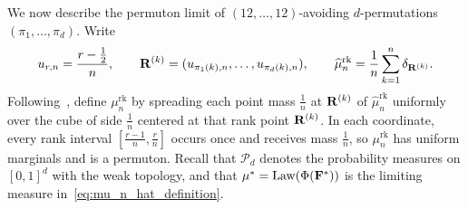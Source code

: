 \documentclass[11pt,letterpaper]{article}
\begin{document}
We now describe the permuton limit of $(12,\ldots,12)$-avoiding $d$-permutations $(\pi_1,\ldots,\pi_d)$.
Write
\[
      u_{r,n}=\frac{r-\tfrac12}{n},\qquad \mathbf R^{(k)}=(u_{\pi_1(k),n},\ldots,u_{\pi_d(k),n}),\qquad \widehat\mu_n^{\mathrm{rk}}=\frac1n\sum_{k=1}^n\delta_{\mathbf R^{(k)}}.
\]
Following~\cite{BL}, define $\mu_n^{\mathrm{rk}}$ by spreading each point mass $\frac1n$ at $\mathbf R^{(k)}$ of $\widehat\mu_n^{\mathrm{rk}}$ uniformly over the cube of side $\frac1n$ centered at that rank point $\mathbf R^{(k)}$. In each coordinate, every rank interval $[\frac{r-1}{n},\frac{r}{n}]$ occurs once and receives mass $\frac1n$, so $\mu_n^{\mathrm{rk}}$ has uniform marginals and is a permuton. Recall that $\mathcal P_d$ denotes the probability measures on $[0,1]^d$ with the weak topology, and that $\mu^\ast=\operatorname{Law}(\Phi(\mathbf F^\ast))$ is the limiting measure in~\eqref{eq:mu_n_hat_definition}.
\end{document}
